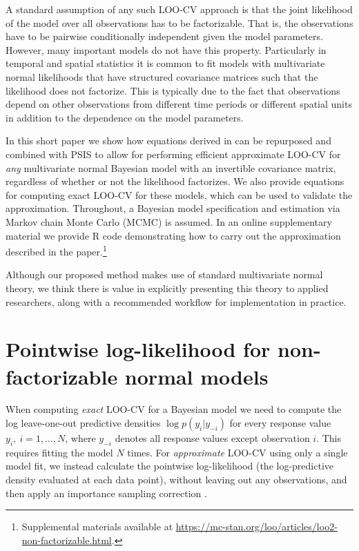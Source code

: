 \documentclass[11pt]{article}
\begin{document}
A standard assumption of any such LOO-CV approach is that the joint likelihood
of the model over all observations has to be factorizable. That is, the
observations have to be pairwise conditionally independent given the model
parameters. However, many important models do not have this property.
Particularly in temporal and spatial statistics it is common to
fit models with multivariate normal likelihoods that have structured covariance
matrices such that the likelihood does not factorize. This is typically due to the 
fact that observations depend on other observations from different time periods 
or different spatial units in addition to the dependence on the model parameters. 

In this short paper we show how equations derived in \cite{sundararajan2001} can
be repurposed and combined with PSIS to allow for performing efficient
approximate LOO-CV for \emph{any} multivariate normal Bayesian model with an
invertible covariance matrix, regardless of whether or not the likelihood
factorizes. We also provide equations for computing exact LOO-CV for these
models, which can be used to validate the approximation. Throughout, a Bayesian
model specification and estimation via Markov chain Monte Carlo (MCMC) is
assumed. In an online supplementary material we provide R code demonstrating how to
carry out the approximation described in the paper.\footnote{
Supplemental materials available at  \url{https://mc-stan.org/loo/articles/loo2-non-factorizable.html}.}

Although our proposed method makes use of standard multivariate normal theory, 
we think there is value in explicitly presenting this theory to applied researchers,  
along with a recommended workflow for implementation in practice.


\section{Pointwise log-likelihood for non-factorizable normal models}
\label{sec-pointwise}

When computing \emph{exact} LOO-CV for a Bayesian model we need to compute the
log leave-one-out predictive densities $\log{p(y_i | y_{-i})}$ for every
response value $y_i, \: i = 1, \ldots, N$, where $y_{-i}$ denotes all response
values except observation $i$. This requires fitting the model $N$ times. For
\emph{approximate} LOO-CV using only a single model fit, we instead calculate
the pointwise log-likelihood (the log-predictive density evaluated at
each data point), without leaving out any observations, and then apply an
importance sampling correction \citep{gelfand1992, vehtari2017loo}.
\end{document}
